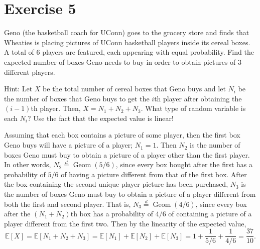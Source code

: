 \documentclass[12pt]{article}
\newenvironment{problem}
    {\begin{lrbox}{\mybox}\begin{minipage}{0.98\textwidth}}
    {\end{minipage}\end{lrbox}\framebox[\textwidth]{\usebox{\mybox}}}
\newcommand{\E}{\mathbb{E}} %
\newcommand{\<}{\left\langle} %
\renewcommand{\>}{\right\rangle} %
\begin{document}
\newpage
\section*{Exercise 5}
\begin{problem}
    Geno (the basketball coach for UConn) goes to the grocery store and finds that Wheaties is placing pictures of UConn basketball players inside its cereal boxes. A total of 6 players are featured, each appearing with equal probability. Find the expected number of boxes Geno needs to buy in order to obtain pictures of 3 different players.
    
    Hint: Let $X$ be the total number of cereal boxes that Geno buys and let $N_i$ be the number of boxes that Geno buys to get the $i$th player after obtaining the $(i-1)$th player. Then, $X = N_1 + N_2 + N_3$. What type of random variable is each $N_i$? Use the fact that the expected value is linear!
\end{problem}
\medskip

Assuming that each box contains a picture of some player, then the first box Geno buys will have a picture of a player; $N_1 = 1$. Then $N_2$ is the number of boxes Geno must buy to obtain a picture of a player other than the first player. In other words, $N_2 \overset{d}{=} \operatorname{Geom}(5/6)$, since every box bought after the first has a probability of $5/6$ of having a picture different from that of the first box. After the box containing the second unique player picture has been purchased, $N_3$ is the number of boxes Geno must buy to obtain a picture of a player different from both the first and second player. That is, $N_3 \overset{d}{=} \operatorname{Geom}(4/6)$, since every box after the $(N_1 + N_2)$th box has a probability of $4/6$ of containing a picture of a player different from the first two. Then by the linearity of the expected value,
\[\E[X] = \E[N_1 + N_2 + N_3] = \E[N_1] + \E[N_2] + \E[N_3] = 1 + \frac1{5/6} + \frac1{4/6} = \frac{37}{10}.\]
\end{document}
